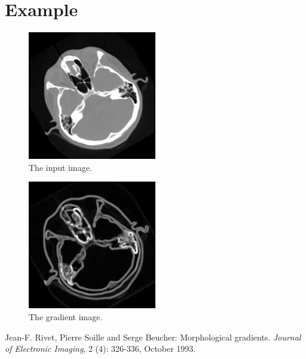 \documentclass[IJ]{cesj}
\begin{document}
\section{Example}
\begin{figure}[hb]
\centering
\includegraphics[width=0.5\textwidth]{cthead1}
\caption{The input image.}
\end{figure}

\begin{figure}[hb]
\centering
\includegraphics[width=0.5\textwidth]{gradient}
\caption{The gradient image.}
\end{figure}

\begin{thebibliography}{n}
 Jean-F. Rivet, Pierre Soille and Serge Beucher: Morphological gradients. \emph{Journal of Electronic Imaging}, 2 (4): 326-336, October 1993.
\end{thebibliography}
\end{document}
